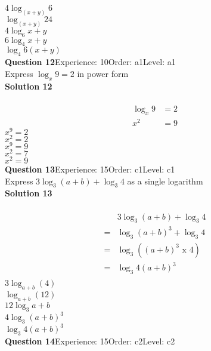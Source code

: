 \documentclass{article}
\begin{document}
$4\log_{(x+y)}6$\\
$\log_{(x+y)}24$\\
$4\log_{6}x+y$\\
$6\log_{4}x+y$\\
$\log_{4}6(x+y)$\\
\noindent\textbf{Question 12}\hspace{20pt}Experience: 10\hspace{20pt}Order: a1\hspace{20pt}Level: a1\\[2pt]
Express $\log_x9=2$ in power form\\[4pt]
\noindent\textbf{Solution 12}\\[2pt]
\\[-10pt]\begin{align*}
\log_x9&=2\\[2pt]
x^2&=9
\end{align*}
$x^9=2$\\
$x^2=2$\\
$x^9=9$\\
$x^2=7$\\
$x^2=9$\\
\noindent\textbf{Question 13}\hspace{20pt}Experience: 15\hspace{20pt}Order: c1\hspace{20pt}Level: c1\\[2pt]
Express $3\log_{3}(a+b)+\log_{3}4$ as a single logarithm\\[4pt]
\noindent\textbf{Solution 13}\\[2pt]
\\[-10pt]\begin{align*}
&3\log_{3}(a+b)+\log_{3}4\\[2pt]
=&\log_{3}(a+b)^3+\log_{3}4\\[2pt]
=&\log_{3}((a+b)^3 \,\, \text{x} \,\, 4)\\[2pt]
=&\log_{3}4(a+b)^3\\[-80pt]
\end{align*}
$3\log_{a+b}(4)$\\
$\log_{a+b}(12)$\\
$12\log_{3}a+b$\\
$4\log_{3}(a+b)^3$\\
$\log_{3}4(a+b)^3$\\
\noindent\textbf{Question 14}\hspace{20pt}Experience: 15\hspace{20pt}Order: c2\hspace{20pt}Level: c2\\[2pt]
\end{document}
